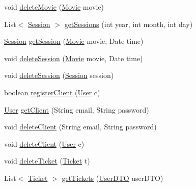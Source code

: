 \begin{DoxyCompactItemize}
void \mbox{\hyperlink{classes_1_1deusto_1_1server_1_1jdo_1_1_d_a_o_a479ca9a8597aada4e74445699140e0fd}{delete\+Movie}} (\mbox{\hyperlink{classes_1_1deusto_1_1server_1_1jdo_1_1_movie}{Movie}} movie)
\item 
List$<$ \mbox{\hyperlink{classes_1_1deusto_1_1server_1_1jdo_1_1_session}{Session}} $>$ \mbox{\hyperlink{classes_1_1deusto_1_1server_1_1jdo_1_1_d_a_o_a2f9f9eb5adc37f559d7fefe2da6544f1}{get\+Sessions}} (int year, int month, int day)
\item 
\mbox{\hyperlink{classes_1_1deusto_1_1server_1_1jdo_1_1_session}{Session}} \mbox{\hyperlink{classes_1_1deusto_1_1server_1_1jdo_1_1_d_a_o_a34f9e5400280bbc1a9fce9143696470e}{get\+Session}} (\mbox{\hyperlink{classes_1_1deusto_1_1server_1_1jdo_1_1_movie}{Movie}} movie, Date time)
\item 
void \mbox{\hyperlink{classes_1_1deusto_1_1server_1_1jdo_1_1_d_a_o_a399605bc2a2fd86679ddf7793b71de12}{delete\+Session}} (\mbox{\hyperlink{classes_1_1deusto_1_1server_1_1jdo_1_1_movie}{Movie}} movie, Date time)
\item 
void \mbox{\hyperlink{classes_1_1deusto_1_1server_1_1jdo_1_1_d_a_o_aa4010f98d33fbdb583bb361ab576ff2d}{delete\+Session}} (\mbox{\hyperlink{classes_1_1deusto_1_1server_1_1jdo_1_1_session}{Session}} session)
\item 
boolean \mbox{\hyperlink{classes_1_1deusto_1_1server_1_1jdo_1_1_d_a_o_a783758c37658336ee1e4e995a672a0ce}{register\+Client}} (\mbox{\hyperlink{classes_1_1deusto_1_1server_1_1jdo_1_1_user}{User}} c)
\item 
\mbox{\hyperlink{classes_1_1deusto_1_1server_1_1jdo_1_1_user}{User}} \mbox{\hyperlink{classes_1_1deusto_1_1server_1_1jdo_1_1_d_a_o_a340f51843de8957e9ef8b0c95081512a}{get\+Client}} (String email, String password)
\item 
void \mbox{\hyperlink{classes_1_1deusto_1_1server_1_1jdo_1_1_d_a_o_a9664ce68819a53c7b27add7f305a52b0}{delete\+Client}} (String email, String password)
\item 
void \mbox{\hyperlink{classes_1_1deusto_1_1server_1_1jdo_1_1_d_a_o_aa914bb9b49e39cfa9a1254ce578aaae1}{delete\+Client}} (\mbox{\hyperlink{classes_1_1deusto_1_1server_1_1jdo_1_1_user}{User}} c)
\item 
void \mbox{\hyperlink{classes_1_1deusto_1_1server_1_1jdo_1_1_d_a_o_a174a90986e95dcae4ab728c8d1a16ca8}{delete\+Ticket}} (\mbox{\hyperlink{classes_1_1deusto_1_1server_1_1jdo_1_1_ticket}{Ticket}} t)
\item 
List$<$ \mbox{\hyperlink{classes_1_1deusto_1_1server_1_1jdo_1_1_ticket}{Ticket}} $>$ \mbox{\hyperlink{classes_1_1deusto_1_1server_1_1jdo_1_1_d_a_o_a7bbfb6c3ed916f93425081d4a24ec6ea}{get\+Tickets}} (\mbox{\hyperlink{classes_1_1deusto_1_1server_1_1data_1_1_user_d_t_o}{User\+D\+TO}} user\+D\+TO)
\end{DoxyCompactItemize}


